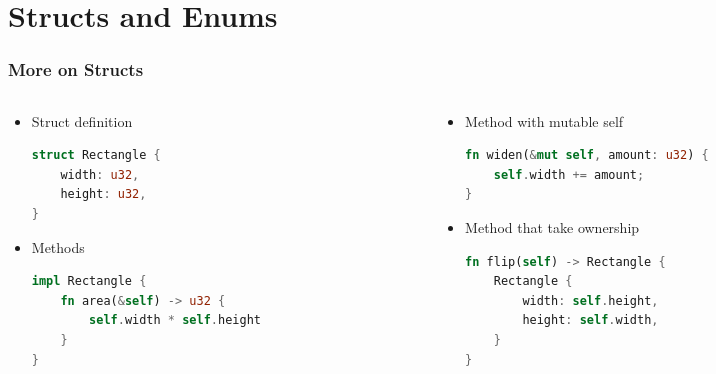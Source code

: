  \section{Structs and Enums}

\begin{frame}[fragile]
    \frametitle{More on Structs}

    \begin{columns}
    \begin{column}{0.5\textwidth}

    \begin{itemize}
        \item<1-> Struct definition
        \begin{lstlisting}[language=rust]
struct Rectangle {
    width: u32,
    height: u32,
}
        \end{lstlisting}

        \item<2-> Methods
        \begin{lstlisting}[language=rust]
impl Rectangle {
    fn area(&self) -> u32 {
        self.width * self.height
    }
}
        \end{lstlisting}
    \end{itemize}

    \end{column}
    \begin{column}{0.5\textwidth}

    \begin{itemize}
        \item<3-> Method with mutable self
        \begin{lstlisting}[language=rust]
fn widen(&mut self, amount: u32) {
    self.width += amount;
}
        \end{lstlisting}

        \item<4-> Method that take ownership
        \begin{lstlisting}[language=rust]
fn flip(self) -> Rectangle {
    Rectangle {
        width: self.height,
        height: self.width,
    }
}
        \end{lstlisting}
    \end{itemize}

    \end{column}
    \end{columns}
\end{frame}

